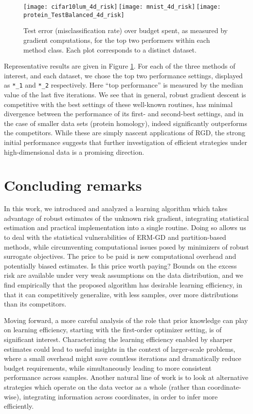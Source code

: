 \documentclass[11pt,oneside]{article}
\theoremstyle{definition} \newtheorem{defn}{Definition}       %
\theoremstyle{plain} \newtheorem{prop}[defn]{Proposition}           %
\theoremstyle{plain} \newtheorem{thm}[defn]{Theorem}                %
\theoremstyle{plain} \newtheorem{lem}[defn]{Lemma}                  %
\theoremstyle{plain} \newtheorem{cor}[defn]{Corollary}              %
\theoremstyle{remark} \newtheorem{rmk}[defn]{Remark}                %
\theoremstyle{remark} \newtheorem{ex}[defn]{Example}                %
\begin{document}
\begin{figure}[t]
\centering
\texttt{[image: cifar10lum\_4d\_risk]}\,\texttt{[image: mnist\_4d\_risk]}\,\texttt{[image: protein\_TestBalanced\_4d\_risk]}
\caption{Test error (misclassification rate) over budget spent, as measured by gradient computations, for the top two performers within each method class. Each plot corresponds to a distinct dataset.}
\label{fig:tests_real}
\end{figure}

Representative results are given in Figure \ref{fig:tests_real}. For each of the three methods of interest, and each dataset, we chose the top two performance settings, displayed as \texttt{*\_1} and \texttt{*\_2} respectively. Here ``top performance'' is measured by the median value of the last five iterations. We see that in general, robust gradient descent is competitive with the best settings of these well-known routines, has minimal divergence between the performance of its first- and second-best settings, and in the case of smaller data sets (protein homology), indeed significantly outperforms the competitors. While these are simply nascent applications of RGD, the strong initial performance suggests that further investigation of efficient strategies under high-dimensional data is a promising direction.


\section{Concluding remarks}\label{sec:conclusion}

In this work, we introduced and analyzed a learning algorithm which takes advantage of robust estimates of the unknown risk gradient, integrating statistical estimation and practical implementation into a single routine. Doing so allows us to deal with the statistical vulnerabilities of ERM-GD and partition-based methods, while circumventing computational issues posed by minimizers of robust surrogate objectives. The price to be paid is new computational overhead and potentially biased estimates. Is this price worth paying? Bounds on the excess risk are available under very weak assumptions on the data distribution, and we find empirically that the proposed algorithm has desirable learning efficiency, in that it can competitively generalize, with less samples, over more distributions than its competitors.

Moving forward, a more careful analysis of the role that prior knowledge can play on learning efficiency, starting with the first-order optimizer setting, is of significant interest. Characterizing the learning efficiency enabled by sharper estimates could lead to useful insights in the context of larger-scale problems, where a small overhead might save countless iterations and dramatically reduce budget requirements, while simultaneously leading to more consistent performance across samples. Another natural line of work is to look at alternative strategies which operate on the data vector as a whole (rather than coordinate-wise), integrating information across coordinates, in order to infer more efficiently.
\end{document}
